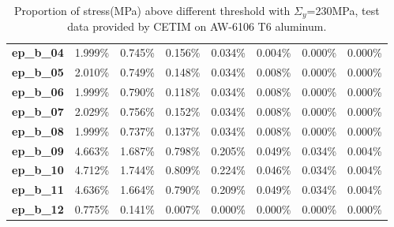 \documentclass[3p,times,procedia,number]{elsarticle}
\begin{document}
\begin{table}[!h]
\begin{tabular}{llllllll}
		\textbf{ep\_b\_04}           & 1.999\%        & 0.745\%        & 0.156\%        & 0.034\%         & 0.004\%         & 0.000\%         & 0.000\%         \\
		\textbf{ep\_b\_05}           & 2.010\%        & 0.749\%        & 0.148\%        & 0.034\%         & 0.008\%         & 0.000\%         & 0.000\%         \\
		\textbf{ep\_b\_06}           & 1.999\%        & 0.790\%        & 0.118\%        & 0.034\%         & 0.008\%         & 0.000\%         & 0.000\%         \\
		\textbf{ep\_b\_07}           & 2.029\%        & 0.756\%        & 0.152\%        & 0.034\%         & 0.008\%         & 0.000\%         & 0.000\%         \\
		\textbf{ep\_b\_08}           & 1.999\%        & 0.737\%        & 0.137\%        & 0.034\%         & 0.008\%         & 0.000\%         & 0.000\%         \\
		\textbf{ep\_b\_09}           & 4.663\%        & 1.687\%        & 0.798\%        & 0.205\%         & 0.049\%         & 0.034\%         & 0.004\%         \\
		\textbf{ep\_b\_10}           & 4.712\%        & 1.744\%        & 0.809\%        & 0.224\%         & 0.046\%         & 0.034\%         & 0.004\%         \\
		\textbf{ep\_b\_11}           & 4.636\%        & 1.664\%        & 0.790\%        & 0.209\%         & 0.049\%         & 0.034\%         & 0.004\%         \\
		\textbf{ep\_b\_12}           & 0.775\%        & 0.141\%        & 0.007\%        & 0.000\%         & 0.000\%         & 0.000\%         & 0.000\%         \\ \hline
	\end{tabular}
	\caption{Proportion of stress(MPa) above different threshold with $\Sigma_y$=230MPa, test data provided by CETIM on AW-6106 T6 aluminum.}
	\label{tab.majordamage}
\end{table}
\end{document}
